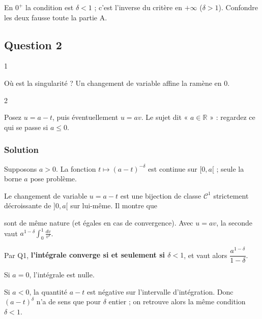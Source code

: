 \documentclass[11pt,a4paper]{article}
\newcommand{\equationajustee}[1]{%
  \sbox{\boiteequation}{$\displaystyle #1$}%
  \ifdim\wd\boiteequation>\linewidth
    \[\resizebox{\linewidth}{!}{\usebox{\boiteequation}}\]%
  \else
    \[#1\]%
  \fi}
\begin{document}
\begin{piege}

En \(0^+\) la condition est \(\delta<1\) ; c'est l'inverse du critère en \(+\infty\) (\(\delta>1\)). Confondre les deux fausse toute la partie A.

\end{piege}

\hypertarget{question-2}{%
\subsection{Question 2}\label{question-2}}

\begin{indication}{1}

Où est la singularité ? Un changement de variable affine la ramène en \(0\).

\end{indication}

\begin{indication}{2}

Posez \(u=a-t\), puis éventuellement \(u=av\). Le sujet dit « \(a\in\mathbb R\) » : regardez ce qui se passe si \(a\leqslant0\).

\end{indication}

\hypertarget{solution-1}{%
\subsubsection{Solution}\label{solution-1}}

Supposons \(a>0\). La fonction \(t\mapsto(a-t)^{-\delta}\) est continue sur \([0,a[\) ; seule la borne \(a\) pose problème.

Le changement de variable \(u=a-t\) est une bijection de classe \(\mathcal C^1\) strictement décroissante de \(]0,a[\) sur lui-même. Il montre que

\equationajustee{\int_0^a\frac{dt}{(a-t)^\delta}\quad\text{et}\quad\int_0^a\frac{du}{u^\delta}}

sont de même nature (et égales en cas de convergence). Avec \(u=av\), la seconde vaut \(a^{1-\delta}\int_0^1\frac{dv}{v^\delta}\).

Par Q1, \textbf{l'intégrale converge si et seulement si \(\delta<1\)}, et vaut alors \(\dfrac{a^{1-\delta}}{1-\delta}\).

Si \(a=0\), l'intégrale est nulle.

Si \(a<0\), la quantité \(a-t\) est négative sur l'intervalle d'intégration. Donc \((a-t)^\delta\) n'a de sens que pour \(\delta\) entier ; on retrouve alors la même condition \(\delta<1\).
\end{document}
